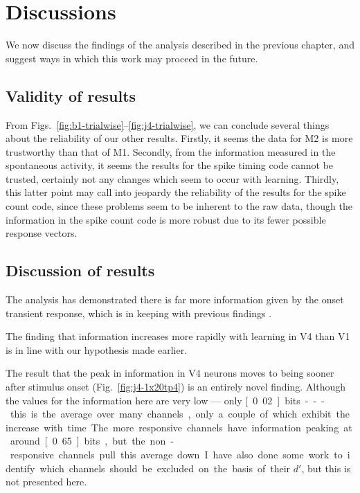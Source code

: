 \section{Discussions}

We now discuss the findings of the analysis described in the previous chapter, and suggest ways in which this work may proceed in the future.

\subsection{Validity of results}

From Figs.~\ref{fig:b1-trialwise}--\ref{fig:j4-trialwise}, we can conclude several things about the reliability of our other results.
Firstly, it seems the data for M2 is more trustworthy than that of M1.
Secondly, from the information measured in the spontaneous activity, it seems the results for the spike timing code cannot be trusted, certainly not any changes which seem to occur with learning.
Thirdly, this latter point may call into jeopardy the reliability of the results for the spike count code, since these problems seem to be inherent to the raw data, though the information in the spike count code is more robust due to its fewer possible response vectors.

\subsection{Discussion of results}

The analysis has demonstrated there is far more information given by the onset transient response, which is in keeping with previous findings \cite{Muller2001}.

The finding that information increases more rapidly with learning in V4 than V1 is in line with our hypothesis made earlier.

The result that the peak in information in V4 neurons moves to being sooner after stimulus onset (Fig.~\ref{fig:j4-1x20tp4}) is an entirely novel finding. Although the values for the information here are very low --- only \unit[0.02]{bits} --- this is the average over many channels, only a couple of which exhibit the increase with time. The more responsive channels have information peaking at around \unit[0.65]{bits}, but the non-responsive channels pull this average down. I have also done some work to identify which channels should be excluded on the basis of their $d'$, but this is not presented here.

